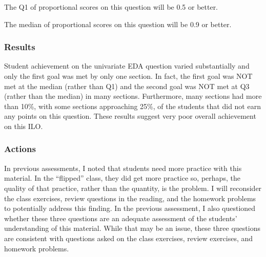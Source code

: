 \documentclass{article}\usepackage[]{graphicx}\usepackage[]{color}
\begin{document}
\begin{Enumerate}
  \item The Q1 of proportional scores on this question will be 0.5 or better.
  \item The median of proportional scores on this question will be 0.9 or better.
\end{Enumerate}

\subsubsection{Results}
\vspace{-12pt}


Student achievement on the univariate EDA question varied substantially  and only the first goal was met by only one section. In fact, the first goal was NOT met at the median (rather than Q1) and the second goal was NOT met at Q3 (rather than the median) in many sections. Furthermore, many sections had more than 10\%, with some sections approaching 25\%, of the students that did not earn any points on this question. These results suggest very poor overall achievement on this ILO.

\subsubsection{Actions}
\vspace{-12pt}
In previous assessments, I noted that students need more practice with this material. In the ``flipped'' class, they did get more practice so, perhaps, the quality of that practice, rather than the quantity, is the problem. I will reconsider the class exercises, review questions in the reading, and the homework problems to potentially address this finding. In the previous assessment, I also questioned whether these three questions are an adequate assessment of the students' understanding of this material. While that may be an issue, these three questions are consistent with questions asked on the class exercises, review exercises, and homework problems.
\vspace{12pt}
\end{document}
